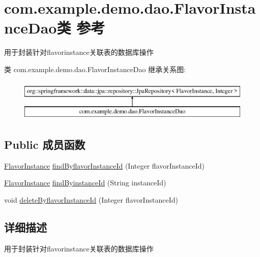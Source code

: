 \hypertarget{interfacecom_1_1example_1_1demo_1_1dao_1_1_flavor_instance_dao}{}\section{com.\+example.\+demo.\+dao.\+Flavor\+Instance\+Dao类 参考}
\label{interfacecom_1_1example_1_1demo_1_1dao_1_1_flavor_instance_dao}


用于封装针对flavorinstance关联表的数据库操作  


类 com.\+example.\+demo.\+dao.\+Flavor\+Instance\+Dao 继承关系图\+:\begin{figure}[H]
\begin{center}
\leavevmode
\includegraphics[height=2.000000cm]{interfacecom_1_1example_1_1demo_1_1dao_1_1_flavor_instance_dao}
\end{center}
\end{figure}
\subsection*{Public 成员函数}
\begin{DoxyCompactItemize}
\item 
\mbox{\hyperlink{classcom_1_1example_1_1demo_1_1modular_1_1_flavor_instance}{Flavor\+Instance}} \mbox{\hyperlink{interfacecom_1_1example_1_1demo_1_1dao_1_1_flavor_instance_dao_ad82d960f7bd8187c741addeaf749bf56}{find\+Byflavor\+Instance\+Id}} (Integer flavor\+Instance\+Id)
\item 
\mbox{\hyperlink{classcom_1_1example_1_1demo_1_1modular_1_1_flavor_instance}{Flavor\+Instance}} \mbox{\hyperlink{interfacecom_1_1example_1_1demo_1_1dao_1_1_flavor_instance_dao_a8eb606bed8739292de9a05bc301aedea}{find\+Byinstance\+Id}} (String instance\+Id)
\item 
void \mbox{\hyperlink{interfacecom_1_1example_1_1demo_1_1dao_1_1_flavor_instance_dao_a90c04a37ac75e8c9d006985e06c02bb3}{delete\+Byflavor\+Instance\+Id}} (Integer flavor\+Instance\+Id)
\end{DoxyCompactItemize}


\subsection{详细描述}
用于封装针对flavorinstance关联表的数据库操作 

